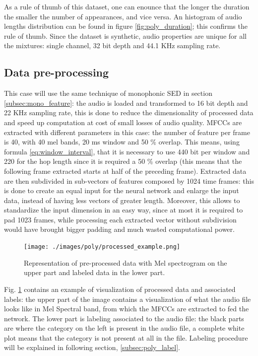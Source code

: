 \documentclass{article}
\begin{document}
As a rule of thumb of this dataset, one can enounce that the longer the duration the smaller the number of appearances, and vice versa. An histogram of audio lengths distribution can be found in figure \ref{fig:poly_duration}; this confirms the rule of thumb.\newline
Since the dataset is synthetic, audio properties are unique for all the mixtures: single channel, 32 bit depth and 44.1 KHz sampling rate.

\subsection{Data pre-processing}
\label{subsec:poly_feature}

This case will use the same technique of monophonic SED in section \ref{subsec:mono_feature}: the audio is loaded and transformed to 16 bit depth and 22 KHz sampling rate, this is done to reduce the dimensionality of processed data and speed up computation at cost of small losses of audio quality.\newline
MFCCs are extracted with different parameters in this case: the number of feature per frame is 40, with 40 mel bands, 20 ms window and 50 \% overlap. This means, using formula \ref{eq:window_interval}, that it is necessary to use 440 bit per window and 220 for the hop length since it is required a 50 \% overlap (this means that the following frame extracted starts at half of the preceding frame).\newline
Extracted data are then subdivided in sub-vectors of features composed by 1024 time frames: this is done to create an equal input for the neural network and enlarge the input data, instead of having less vectors of greater length. Moreover, this allows to standardize the input dimension in an easy way, since at most it is required to pad 1023 frames, while processing each extracted vector without subdivision would have brought bigger padding and much wasted computational power.

\begin{figure}[H]
	\centering
	\texttt{[image: ./images/poly/processed\_example.png]}	
	\caption{Representation of pre-processed data with Mel spectrogram on the upper part and labeled data in the lower part.}
	\label{fig:poly_processed}
\end{figure}

Fig. \ref{fig:poly_processed} contains an example of visualization of processed data and associated labels: the upper part of the image contains a visualization of what the audio file looks like in Mel Spectral band, from which the MFCCs are extracted to fed the network. The lower part is labeling associated to the audio file: the black parts are where the category on the left is present in the audio file, a complete white plot means that the category is not present at all in the file. Labeling procedure will be explained in following section, \ref{subsec:poly_label}.
\end{document}
